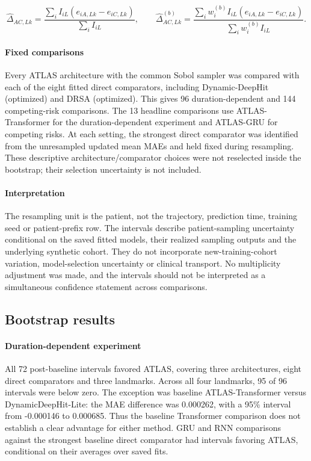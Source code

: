 \[
\widehat\Delta_{AC,Lk}=\frac{\sum_i I_{iL}(e_{iA,Lk}-e_{iC,Lk})}{\sum_i I_{iL}},\qquad
\widehat\Delta^{(b)}_{AC,Lk}=\frac{\sum_i w_i^{(b)}I_{iL}(e_{iA,Lk}-e_{iC,Lk})}{\sum_i w_i^{(b)}I_{iL}}.
\]
\paragraph{Fixed comparisons} Every ATLAS architecture with the common Sobol sampler was compared with each of the eight fitted direct comparators, including Dynamic-DeepHit (optimized) and DRSA (optimized). This gives 96 duration-dependent and 144 competing-risk comparisons. The 13 headline comparisons use ATLAS-Transformer for the duration-dependent experiment and ATLAS-GRU for competing risks. At each setting, the strongest direct comparator was identified from the unresampled updated mean MAEs and held fixed during resampling. These descriptive architecture/comparator choices were not reselected inside the bootstrap; their selection uncertainty is not included.

\paragraph{Interpretation} The resampling unit is the patient, not the trajectory, prediction time, training seed or patient-prefix row. The intervals describe patient-sampling uncertainty conditional on the saved fitted models, their realized sampling outputs and the underlying synthetic cohort. They do not incorporate new-training-cohort variation, model-selection uncertainty or clinical transport. No multiplicity adjustment was made, and the intervals should not be interpreted as a simultaneous confidence statement across comparisons.

\subsection{Bootstrap results}
\paragraph{Duration-dependent experiment} All 72 post-baseline intervals favored ATLAS, covering three architectures, eight direct comparators and three landmarks. Across all four landmarks, 95 of 96 intervals were below zero. The exception was baseline ATLAS-Transformer versus DynamicDeepHit-Lite: the MAE difference was 0.000262, with a 95\% interval from -0.000146 to 0.000685. Thus the baseline Transformer comparison does not establish a clear advantage for either method. GRU and RNN comparisons against the strongest baseline direct comparator had intervals favoring ATLAS, conditional on their averages over saved fits.

